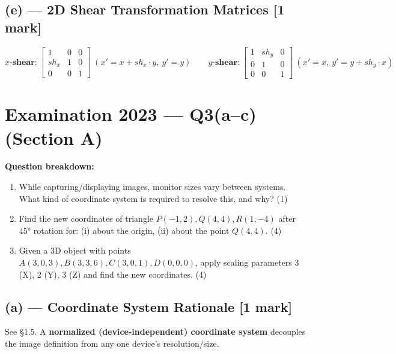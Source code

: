 \documentclass[12pt, a4paper]{article}
\newenvironment{solutionbox}{\begin{mdframed}[style=solutionframe]}{\end{mdframed}}
\newenvironment{answerbox}{\begin{mdframed}[style=answerframe]}{\end{mdframed}}
\begin{document}
\subsection*{(e) --- 2D Shear Transformation Matrices [1 mark]}
\begin{answerbox}
$$\textbf{$x$-shear:}\ \begin{bmatrix}1 & 0 & 0\\ sh_x & 1 & 0\\ 0&0&1\end{bmatrix}\ (x'=x+sh_x\cdot y,\ y'=y) \qquad \textbf{$y$-shear:}\ \begin{bmatrix}1 & sh_y & 0\\ 0 & 1 & 0\\ 0&0&1\end{bmatrix}\ (x'=x,\ y'=y+sh_y\cdot x)$$
\end{answerbox}

\section{Examination 2023 --- Q3(a--c) (Section A)}
\begin{solutionbox}
\textbf{Question breakdown:}
\begin{enumerate}[noitemsep]
  \item[(a)] While capturing/displaying images, monitor sizes vary between systems. What kind of coordinate system is required to resolve this, and why? (1)
  \item[(b)] Find the new coordinates of triangle $P(-1,2), Q(4,4), R(1,-4)$ after $45°$ rotation for: (i) about the origin, (ii) about the point $Q(4,4)$. (4)
  \item[(c)] Given a 3D object with points $A(3,0,3), B(3,3,6), C(3,0,1), D(0,0,0)$, apply scaling parameters $3$ (X), $2$ (Y), $3$ (Z) and find the new coordinates. (4)
\end{enumerate}
\end{solutionbox}

\subsection*{(a) --- Coordinate System Rationale [1 mark]}
See \S1.5. A \textbf{normalized (device-independent) coordinate system} decouples the image definition from any one device's resolution/size.
\end{document}
